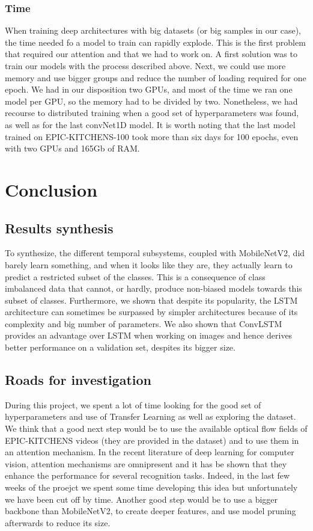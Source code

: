 \documentclass[12pt, a4paper]{report}
\begin{document}
			\subsection{Time}
				When training deep architectures with big datasets (or big samples in our case), the time needed fo a model to train can rapidly explode.
				This is the first problem that required our attention and that we had to work on.
				A first solution was to train our models with the process described above.
				Next, we could use more memory and use bigger groups and reduce the number of loading required for one epoch.
				We had in our disposition two GPUs, and most of the time we ran one model per GPU, so the memory had to be divided by two.
				Nonetheless, we had recourse to distributed training when a good set of hyperparameters was found, as well as for the last convNet1D model.
				It is worth noting that the last model trained on EPIC-KITCHENS-100 took more than six days for 100 epochs, even with two GPUs and 165Gb of RAM.
	\chapter{Conclusion}
		\section*{Results synthesis}
			To synthesize, the different temporal subsystems, coupled with MobileNetV2, did barely learn something, and when it looks like they are, they actually learn to predict a restricted subset of the classes.
			This is a consequence of class imbalanced data that cannot, or hardly, produce non-biased models towards this subset of classes.
			Furthermore, we shown that despite its popularity, the LSTM architecture can sometimes be surpassed by simpler architectures because of its complexity and big number of parameters.
			We also shown that ConvLSTM provides an advantage over LSTM when working on images and hence derives better performance on a validation set, despites its bigger size.
		\section*{Roads for investigation}
			During this project, we spent a lot of time looking for the good set of hyperparameters and use of Transfer Learning as well as exploring the dataset.
			We think that a good next step would be to use the available optical flow fields of EPIC-KITCHENS videos (they are provided in the dataset) and to use them in an attention mechanism.
			In the recent literature of deep learning for computer vision, attention mechanisms are omnipresent and it has be shown that they enhance the performance for several recognition tasks.
			Indeed, in the last few weeks of the proejct we spent some time developing this idea but unfortunately we have been cut off by time.
			Another good step would be to use a bigger backbone than MobileNetV2, to create deeper features, and use model pruning afterwards to reduce its size.
\end{document}
